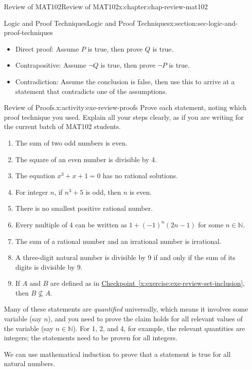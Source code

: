 \documentclass[oneside,10pt,]{book}
\newcommand{\xreffont}{\relax}
\numberwithin{equation}{section}
\begin{document}
\begin{chapterptx}{Review of MAT102}{}{Review of MAT102}{}{}{x:chapter:chap-review-mat102}
\begin{sectionptx}{Logic and Proof Techniques}{}{Logic and Proof Techniques}{}{}{x:section:sec-logic-and-proof-techniques}
\par
%
\begin{itemize}[label=\textbullet]
\item{}Direct proof: Assume \(P\) is true, then prove \(Q\) is true.%
\item{}Contrapositive: Assume \(\neg Q\) is true, then prove \(\neg P\) is true.%
\item{}Contradiction: Assume the conclusion is false, then use this to arrive at a statement that contradicts one of the assumptions.%
\end{itemize}
%
\begin{activity}{Review of Proofs.}{x:activity:exe-review-proofs}%
Prove each statement, noting which proof technique you used. Explain all your steps clearly, as if you are writing for the current batch of MAT102 students.%
\begin{enumerate}[label=(\alph*)]
\item{}The sum of two odd numbers is even.%
\item{}The square of an even number is divisible by 4.%
\item{}The equation \(x^3 + x + 1 = 0\) has no rational solutions.%
\item{}For integer \(n\), if \(n^3 + 5\) is odd, then \(n\) is even.%
\item{}There is no smallest positive rational number.%
\item{}Every multiple of 4 can be written as \(1 + (-1)^n(2n-1)\) for some \(n \in \mathbb{N}\).%
\item{}The sum of a rational number and an irrational number is irrational.%
\item{}A three-digit natural number is divisible by 9 if and only if the sum of its digits is divisible by 9.%
\item{}If \(A\) and \(B\) are defined as in \hyperref[x:exercise:exe-review-set-inclusion]{Checkpoint~{\xreffont\ref{x:exercise:exe-review-set-inclusion}}}, then \(B \not\subseteq A\).%
\end{enumerate}
%
\end{activity}%
Many of these statements are \emph{quantified} universally, which means it involves some variable (say \(n\)), and you need to prove the claim holds for all relevant values of the variable (say \(n \in \mathbb{N}\)). For 1, 2, and 4, for example, the relevant quantities are integers; the statements need to be proven for all integers.%
\par
We can use mathematical induction to prove that a statement is true for all natural numbers.%

\end{sectionptx}
\end{chapterptx}
\end{document}
